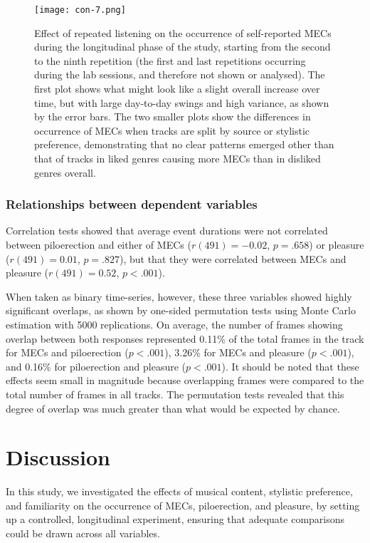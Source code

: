 \begin{figure}[t!]
\texttt{[image: con-7.png]}
\centering
\caption{Effect of repeated listening on the occurrence of self-reported MECs during the longitudinal phase of the study, starting from the second to the ninth repetition (the first and last repetitions occurring during the lab sessions, and therefore not shown or analysed). The first plot shows what might look like a slight overall increase over time, but with large day-to-day swings and high variance, as shown by the error bars. The two smaller plots show the differences in occurrence of MECs when tracks are split by source or stylistic preference, demonstrating that no clear patterns emerged other than that of tracks in liked genres causing more MECs than in disliked genres overall.}
\label{fig:con-7}
\end{figure}

\subsubsection{Relationships between dependent variables}

Correlation tests showed that average event durations were not correlated between piloerection and either of MECs ($r(491) = -0.02$, $p = .658$) or pleasure ($r(491) = 0.01$, $p = .827$), but that they were correlated between MECs and pleasure ($r(491) = 0.52$, $p < .001$).

When taken as binary time-series, however, these three variables showed highly significant overlaps, as shown by one-sided permutation tests using Monte Carlo estimation with 5000 replications. On average, the number of frames showing overlap between both responses represented 0.11\% of the total frames in the track for MECs and piloerection ($p < .001$), 3.26\% for MECs and pleasure ($p < .001$), and 0.16\% for piloerection and pleasure ($p < .001$). It should be noted that these effects seem small in magnitude because overlapping frames were compared to the total number of frames in all tracks. The permutation tests revealed that this degree of overlap was much greater than what would be expected by chance.

\section{Discussion}

In this study, we investigated the effects of musical content, stylistic preference, and familiarity on the occurrence of MECs, piloerection, and pleasure, by setting up a controlled, longitudinal experiment, ensuring that adequate comparisons could be drawn across all variables.

